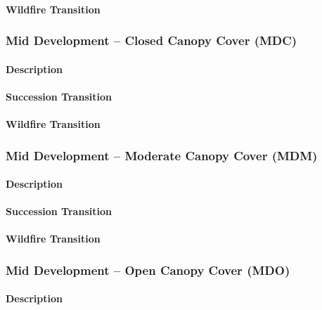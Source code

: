 \paragraph{Wildfire Transition}

\hrulefill


\subsubsection{Mid Development – Closed Canopy Cover (MDC)}

\paragraph{Description}

\paragraph{Succession Transition}

\paragraph{Wildfire Transition}

\hrulefill

\subsubsection{Mid Development – Moderate Canopy Cover (MDM)}

\paragraph{Description}

\paragraph{Succession Transition}

\paragraph{Wildfire Transition}

\hrulefill

\subsubsection{Mid Development – Open Canopy Cover (MDO)}

\paragraph{Description}


